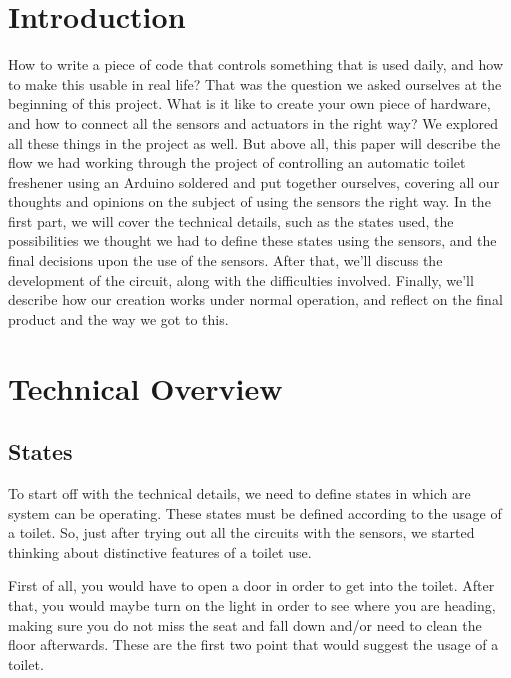 \documentclass[a4paper, 12pt]{article}
\begin{document}
\maketitle

\section{Introduction}
How to write a piece of code that controls something that is used daily, and how to make this usable in real life? That was the question we asked ourselves at the beginning of this project. What is it like to create your own piece of hardware, and how to connect all the sensors and actuators in the right way? We explored all these things in the project as well. But above all, this paper will describe the flow we had working through the project of controlling an automatic toilet freshener using an Arduino soldered and put together ourselves, covering all our thoughts and opinions on the subject of using the sensors the right way. In the first part, we will cover the technical details, such as the states used, the possibilities we thought we had to define these states using the sensors, and the final decisions upon the use of the sensors. After that, we'll discuss the development of the circuit, along with the difficulties involved. Finally, we'll describe how our creation works under normal operation, and reflect on the final product and the way we got to this. 

\section{Technical Overview}


\subsection{States}
\label{sub:state}
To start off with the technical details, we need to define states in which are system can be operating. These states must be defined according to the usage of a toilet. So, just after trying out all the circuits with the sensors, we started thinking about distinctive features of a toilet use. 

First of all, you would have to open a door in order to get into the toilet. After that, you would maybe turn on the light in order to see where you are heading, making sure you do not miss the seat and fall down and/or need to clean the floor afterwards. These are the first two point that would suggest the usage of a toilet.
\end{document}
